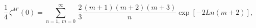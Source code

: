 \begin{equation}
\frac{1}{4}\,\zeta^{M\prime}(0)=\sum_{n=1,\;m=0}^\infty
\,\frac{2}{3}\frac{(m+1)(m+2)(m+3)}{n}
\exp[-2Ln(m+2)],
\end{equation}

